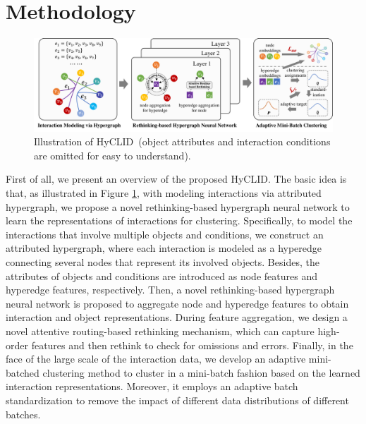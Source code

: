 \documentclass[11pt]{article}
\def\modelname{HyCLID}
\begin{document}
\section{Methodology}    \label{sec:model}
\begin{figure}%
	\centering
	\includegraphics[width=0.93\linewidth]{submissions/HyCLID/figures/model}
	\caption{Illustration of \modelname~(object attributes and interaction conditions are omitted for easy to understand). }
	\label{fig:model}
\end{figure}
First of all, we present an overview of the proposed \modelname.
The basic idea is that, as illustrated in Figure \ref{fig:model}, with modeling interactions via attributed hypergraph, we propose a novel rethinking-based hypergraph neural network to learn the representations of interactions for clustering. Specifically, to model the interactions that involve multiple objects and conditions, we construct an attributed hypergraph, where each interaction is modeled as a hyperedge connecting several nodes that represent its involved objects. Besides, the attributes of objects and conditions are introduced as node features and hyperedge features, respectively. Then, a novel rethinking-based hypergraph neural network is proposed to aggregate node and hyperedge features to obtain interaction and object representations. During feature aggregation, we design a novel attentive routing-based rethinking mechanism, which can capture high-order features and then rethink to check for omissions and errors. Finally, in the face of the large scale of the interaction data, we develop an adaptive mini-batched clustering method to cluster in a mini-batch fashion based on the learned interaction representations. Moreover, it employs an adaptive batch standardization to remove the impact of different data distributions of different batches.
\end{document}
